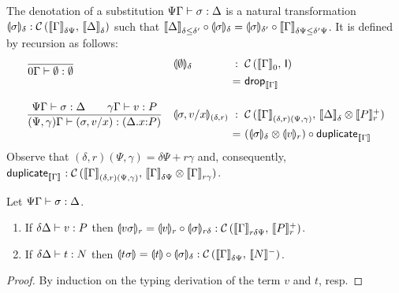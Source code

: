 \documentclass[acmsmall,review,anonymous]{acmart}\settopmatter{printfolios=true,printccs=false,printacmref=false}
\theoremstyle{remark}
\begin{document}
The denotation of a substitution $\SubstTy \Psi \Gamma \sigma \Delta$
is a natural transformation
$\denv \sigma \delta : \Hom {\Den \Gamma {\delta\Psi}} {\Den \Delta
  \delta}$
such that
$
\Den \Delta {\delta \leq \delta'}
\comp
\denv \sigma \delta
=
\denv \sigma {\delta'}
\comp
\Den \Gamma {\delta\Psi \leq \delta'\Psi}
$.
It is defined by recursion as follows:
\[
\begin{array}{ll@{~}c@{~}l@{~}c@{~}l}
\ru{
    }{\SubstTy {0} \Gamma \sempty \cempty}
& \denv \sempty \delta
& : & \Hom {\Den\Gamma 0} \I
\\ &
& = & \tdrop[\den\Gamma]
\\[3ex]
\ru{\SubstTy \Psi \Gamma \sigma \Delta \qquad
      \qValTy \gamma \Gamma v P
    }{\pSubstTy {\Psi,\gamma} \Gamma {\sext \sigma x v} {\ext \Delta x P}}
& \denvp {\sext \sigma x v} {\delta,r}
& : & \Hom  {\Den\Gamma{(\delta,r)(\Psi,\gamma)}} {\Den \Delta \delta \otimes \Denp P r}
\\ &
& = & (\denv \sigma \delta \otimes \denv v r)
\comp \duplicate[\den\Gamma]
\end{array}
\]
Observe that $(\delta,r)(\Psi,\gamma) = \delta\Psi + r\gamma$ and,
consequently,
$\duplicate[\den\Gamma] : \Hom {\Den\Gamma{(\delta,r)(\Psi,\gamma)}}
{\Den\Gamma{\delta\Psi} \otimes \Den\Gamma{r\gamma}}$.
\begin{theorem}
  Let $\SubstTy \Psi \Gamma \sigma \Delta$.
  \begin{enumerate}
  \item If $\qValTy \delta \Delta v P$ then
     $\denv{v\sigma}r = \denv v {r} \comp \denv \sigma {r\delta}
      : \Hom {\Den{\Gamma}{r\delta\Psi}} {\Denp P r}$.
  \item If $\qCompTy \delta \Delta t N$ then
     $\dent{t\sigma} = \dent t \comp \denv \sigma \delta
      : \Hom {\Den\Gamma{\delta\Psi}} {\denn N}$.
  \end{enumerate}
\end{theorem}
\begin{proof}
  By induction on the typing derivation of the term $v$ and $t$, resp.
\end{proof}
\end{document}
